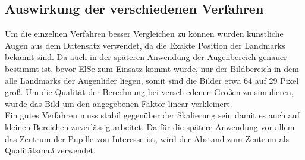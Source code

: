 \subsection{Auswirkung der verschiedenen Verfahren}
Um die einzelnen Verfahren besser Vergleichen zu können wurden künstliche Augen aus dem Datensatz \cite{database_Eye} verwendet, da die Exakte Position der Landmarks bekannt sind.
Da auch in der späteren Anwendung der Augenbereich genauer bestimmt ist, bevor ElSe zum Einsatz kommt wurde, nur der Bildbereich in dem alle Landmarks der Augenlider liegen, somit sind die Bilder etwa 64 auf 29 Pixel groß. Um die Qualität der Berechnung bei verschiedenen Größen zu simulieren, wurde das Bild um den angegebenen Faktor linear verkleinert.\\
Ein gutes Verfahren muss stabil gegenüber der Skalierung sein damit es auch auf kleinen Bereichen zuverlässig arbeitet. Da für die spätere Anwendung vor allem das Zentrum der Pupille von Interesse ist, wird der Abstand zum Zentrum als Qualitätsmaß verwendet.\\
